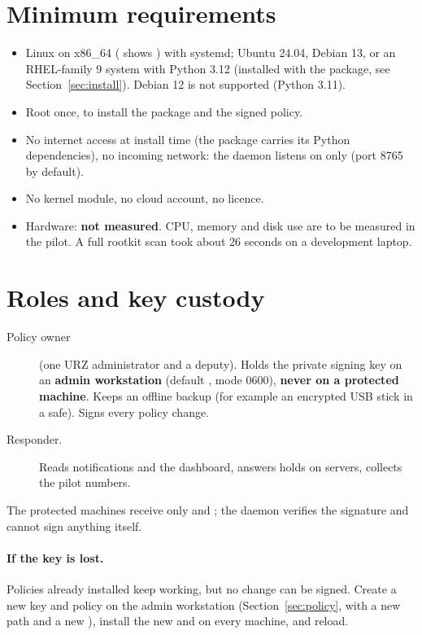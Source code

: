 \documentclass[11pt,a4paper]{article}
\begin{document}
\section{Minimum requirements}
\label{sec:req}
\begin{itemize}
  \item Linux on x86\_64 ( shows ) with systemd; Ubuntu 24.04, Debian 13,
    or an RHEL-family 9 system with Python 3.12 (installed with the package, see
    Section~\ref{sec:install}). Debian 12 is not supported (Python 3.11).
  \item Root once, to install the package and the signed policy.
  \item No internet access at install time (the package carries its Python dependencies), no
    incoming network: the daemon listens on  only (port 8765 by default).
  \item No kernel module, no cloud account, no licence.
  \item Hardware: \textbf{not measured}. CPU, memory and disk use are to be measured in the pilot.
    A full rootkit scan took about 26 seconds on a development laptop.
\end{itemize}

\section{Roles and key custody}
\label{sec:roles}
\begin{description}
  \item[Policy owner] (one URZ administrator and a deputy). Holds the private signing key
     on an \textbf{admin workstation} (default
    , mode 0600), \textbf{never on a protected
    machine}. Keeps an offline backup (for example an encrypted USB stick in a safe). Signs every
    policy change.
  \item[Responder.] Reads notifications and the dashboard, answers holds on servers, collects the
    pilot numbers.
\end{description}
The protected machines receive only  and ; the daemon verifies the
signature and cannot sign anything itself.

\paragraph{If the key is lost.} Policies already installed keep working, but no change can be signed.
Create a new key and policy on the admin workstation (Section~\ref{sec:policy}, with a new
 path and a new ), install the new  and 
on every machine, and reload.
\end{document}
